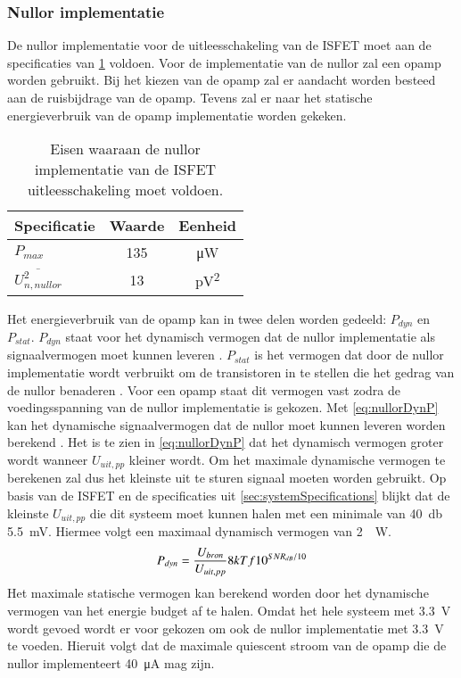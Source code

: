 \subsubsection{Nullor implementatie}
De nullor implementatie voor de uitleesschakeling van de ISFET moet aan de specificaties van \cref{tab:nullorImplementSpecs} voldoen. Voor de implementatie van de nullor zal een opamp worden gebruikt. Bij het kiezen van de opamp zal er aandacht worden besteed aan de ruisbijdrage van de opamp. Tevens zal er naar het statische energieverbruik van de opamp implementatie worden gekeken.
\begin{table}[!htb]
    \centering
    \begin{tabular}{l|c|c}
        Specificatie & Waarde & Eenheid \\\hline
        $P_{max}$ & 135 & \si{\micro\watt}\\
        $\overline{U_{n,nullor}^2}$ & 13 & \si{\pico\volt^2}
    \end{tabular}
    \caption{Eisen waaraan de nullor implementatie van de ISFET uitleesschakeling moet voldoen.}
    \label{tab:nullorImplementSpecs}
\end{table}

Het energieverbruik van de opamp kan in twee delen worden gedeeld: $P_{dyn}$ en $P_{stat}$. $P_{dyn}$ staat voor het dynamisch vermogen dat de nullor implementatie als signaalvermogen moet kunnen leveren \cite{energieZuinigeSystemenOntwerpen}. $P_{stat}$ is het vermogen dat door de nullor implementatie wordt verbruikt om de transistoren in te stellen die het gedrag van de nullor benaderen \cite{energieZuinigeSystemenOntwerpen}. Voor een opamp staat dit vermogen vast zodra de voedingsspanning van de nullor implementatie is gekozen. Met \cref{eq:nullorDynP} kan het dynamische signaalvermogen dat de nullor moet kunnen leveren worden berekend \cite{energieZuinigeSystemenOntwerpen}. Het is te zien in \cref{eq:nullorDynP} dat het dynamisch vermogen groter wordt wanneer $U_{uit,pp}$ kleiner wordt. Om het maximale dynamische vermogen te berekenen zal dus het kleinste uit te sturen signaal moeten worden gebruikt. Op basis van de ISFET en de specificaties uit \cref{sec:systemSpecifications} blijkt dat de kleinste $U_{uit,pp}$ die dit systeem moet kunnen halen met een minimale \SNR van \qty{40}{\decibel} \qty{5.5}{\milli\volt}. Hiermee volgt een maximaal dynamisch vermogen van \qty{2}{\pico.\watt}.
\begin{equation} \label{eq:nullorDynP}
    P_{dyn}=\frac{U_{bron}}{U_{uit,pp}}8kTf10^{SNR_{dB}/10}
    \tagaddtext{[\si{\watt}]}
\end{equation}
Het maximale statische vermogen kan berekend worden door het dynamische vermogen van het energie budget af te halen. Omdat het hele systeem met \qty{3.3}{\volt} wordt gevoed wordt er voor gekozen om ook de nullor implementatie met \qty{3.3}{\volt} te voeden. Hieruit volgt dat de maximale quiescent stroom van de opamp die de nullor implementeert \qty{40}{\micro\ampere} mag zijn.


